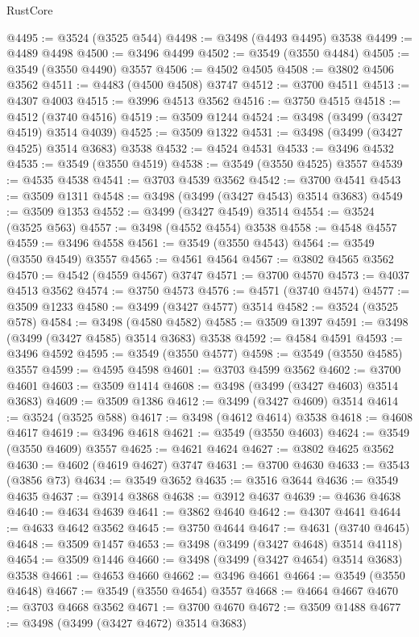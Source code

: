 \begin{lexlean}{RustCore}
\begin{coremodule}
@4495 := @3524 (@3525 @544)
@4498 := @3498 (@4493 @4495) @3538
@4499 := @4489 @4498
@4500 := @3496 @4499
@4502 := @3549 (@3550 @4484)
@4505 := @3549 (@3550 @4490) @3557
@4506 := @4502 @4505
@4508 := @3802 @4506 @3562
@4511 := @4483 (@4500 @4508) @3747
@4512 := @3700 @4511
@4513 := @4307 @4003
@4515 := @3996 @4513 @3562
@4516 := @3750 @4515
@4518 := @4512 (@3740 @4516)
@4519 := @3509 @1244
@4524 := @3498 (@3499 (@3427 @4519) @3514 @4039)
@4525 := @3509 @1322
@4531 := @3498 (@3499 (@3427 @4525) @3514 @3683) @3538
@4532 := @4524 @4531
@4533 := @3496 @4532
@4535 := @3549 (@3550 @4519)
@4538 := @3549 (@3550 @4525) @3557
@4539 := @4535 @4538
@4541 := @3703 @4539 @3562
@4542 := @3700 @4541
@4543 := @3509 @1311
@4548 := @3498 (@3499 (@3427 @4543) @3514 @3683)
@4549 := @3509 @1353
@4552 := @3499 (@3427 @4549) @3514
@4554 := @3524 (@3525 @563)
@4557 := @3498 (@4552 @4554) @3538
@4558 := @4548 @4557
@4559 := @3496 @4558
@4561 := @3549 (@3550 @4543)
@4564 := @3549 (@3550 @4549) @3557
@4565 := @4561 @4564
@4567 := @3802 @4565 @3562
@4570 := @4542 (@4559 @4567) @3747
@4571 := @3700 @4570
@4573 := @4037 @4513 @3562
@4574 := @3750 @4573
@4576 := @4571 (@3740 @4574)
@4577 := @3509 @1233
@4580 := @3499 (@3427 @4577) @3514
@4582 := @3524 (@3525 @578)
@4584 := @3498 (@4580 @4582)
@4585 := @3509 @1397
@4591 := @3498 (@3499 (@3427 @4585) @3514 @3683) @3538
@4592 := @4584 @4591
@4593 := @3496 @4592
@4595 := @3549 (@3550 @4577)
@4598 := @3549 (@3550 @4585) @3557
@4599 := @4595 @4598
@4601 := @3703 @4599 @3562
@4602 := @3700 @4601
@4603 := @3509 @1414
@4608 := @3498 (@3499 (@3427 @4603) @3514 @3683)
@4609 := @3509 @1386
@4612 := @3499 (@3427 @4609) @3514
@4614 := @3524 (@3525 @588)
@4617 := @3498 (@4612 @4614) @3538
@4618 := @4608 @4617
@4619 := @3496 @4618
@4621 := @3549 (@3550 @4603)
@4624 := @3549 (@3550 @4609) @3557
@4625 := @4621 @4624
@4627 := @3802 @4625 @3562
@4630 := @4602 (@4619 @4627) @3747
@4631 := @3700 @4630
@4633 := @3543 (@3856 @73)
@4634 := @3549 @3652
@4635 := @3516 @3644
@4636 := @3549 @4635
@4637 := @3914 @3868
@4638 := @3912 @4637
@4639 := @4636 @4638
@4640 := @4634 @4639
@4641 := @3862 @4640
@4642 := @4307 @4641
@4644 := @4633 @4642 @3562
@4645 := @3750 @4644
@4647 := @4631 (@3740 @4645)
@4648 := @3509 @1457
@4653 := @3498 (@3499 (@3427 @4648) @3514 @4118)
@4654 := @3509 @1446
@4660 := @3498 (@3499 (@3427 @4654) @3514 @3683) @3538
@4661 := @4653 @4660
@4662 := @3496 @4661
@4664 := @3549 (@3550 @4648)
@4667 := @3549 (@3550 @4654) @3557
@4668 := @4664 @4667
@4670 := @3703 @4668 @3562
@4671 := @3700 @4670
@4672 := @3509 @1488
@4677 := @3498 (@3499 (@3427 @4672) @3514 @3683)

\end{coremodule}
\end{lexlean}
